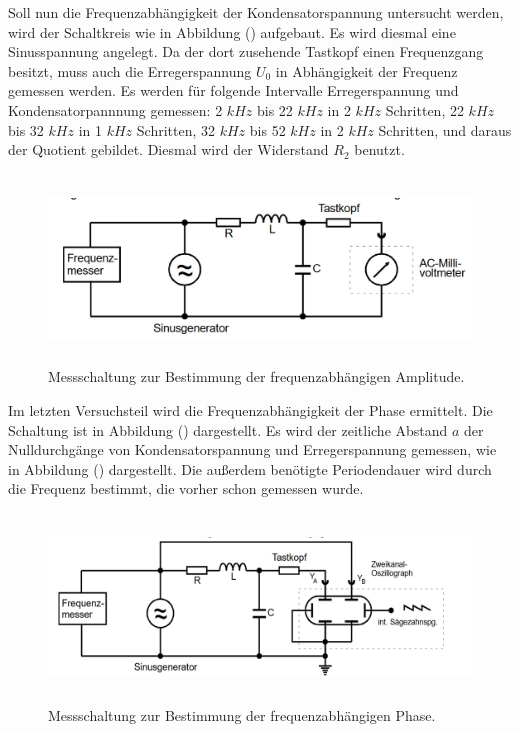 \noindent Soll nun die Frequenzabhängigkeit der Kondensatorspannung untersucht werden, wird der Schaltkreis wie in Abbildung () aufgebaut.
Es wird diesmal eine Sinusspannung angelegt. Da der dort zusehende Tastkopf einen Frequenzgang besitzt, muss auch die Erregerspannung $U_0$ in Abhängigkeit der Frequenz gemessen werden.
Es werden für folgende Intervalle Erregerspannung und Kondensatorpannnung gemessen: 2 $kHz$ bis 22 $kHz$ in 2 $kHz$ Schritten, 22 $kHz$ bis 32 $kHz$ in 1 $kHz$ Schritten,
32 $kHz$ bis 52 $kHz$ in 2 $kHz$ Schritten, und daraus der Quotient gebildet. Diesmal wird der Widerstand  $R_2$ benutzt.
\begin{figure}[H]
  \centering
  \includegraphics[height=5cm]{Schaltung3.png}
  \caption{Messschaltung zur Bestimmung der frequenzabhängigen Amplitude. \cite[S. 11]{kent}}
\end{figure}


\noindent Im letzten Versuchsteil wird die Frequenzabhängigkeit der Phase ermittelt. Die Schaltung ist in Abbildung () dargestellt.
Es wird der zeitliche Abstand $a$ der Nulldurchgänge von Kondensatorspannung und Erregerspannung gemessen, wie in Abbildung () dargestellt.
Die außerdem benötigte Periodendauer wird durch die Frequenz bestimmt, die vorher schon gemessen wurde.
\begin{figure}[H]
  \centering
  \includegraphics[height=5cm]{Schaltung4.png}
  \caption{Messschaltung zur Bestimmung der frequenzabhängigen Phase. \cite[S. 11]{kent}}
\end{figure}


